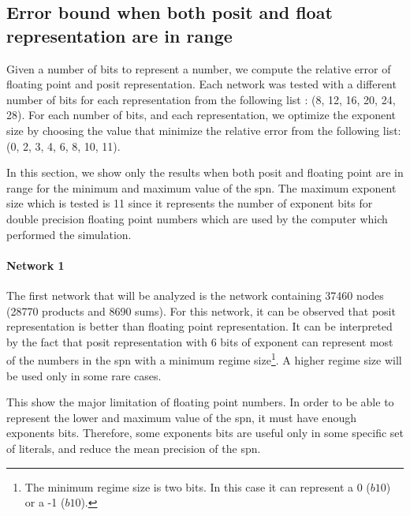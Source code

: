 \subsection{Error bound when both posit and float representation are in range}

Given a number of bits to represent a number, we compute the relative error of floating point and posit representation. Each network was tested with a different number of bits for each representation from the following list : (8, 12, 16, 20, 24, 28). For each number of bits, and each representation, we optimize the exponent size by choosing the value that minimize the relative error from the following list: (0, 2, 3, 4, 6, 8, 10, 11).

In this section, we show only the results when both posit and floating point are in range for the minimum and maximum value of the \gls{spn}. The maximum exponent size which is tested is 11 since it represents the number of exponent bits for double precision floating point numbers which are used by the computer which performed the simulation.

\paragraph{Network 1}

The first network that will be analyzed is the network containing 37460 nodes (28770 products and 8690 sums). For this network, it can be observed that posit representation is better than floating point representation. It can be interpreted by the fact that posit representation with 6 bits of exponent can represent most of the numbers in the \gls{spn} with a minimum regime size\footnote{The minimum regime size is two bits. In this case it can represent a 0 ($b10$) or a -1 ($b10$).}. A higher regime size will be used only in some rare cases.

This show the major limitation of floating point numbers. In order to be able to represent the lower and maximum value of the \gls{spn}, it must have enough exponents bits. Therefore, some exponents bits are useful only in some specific set of literals, and reduce the mean precision of the \gls{spn}.

